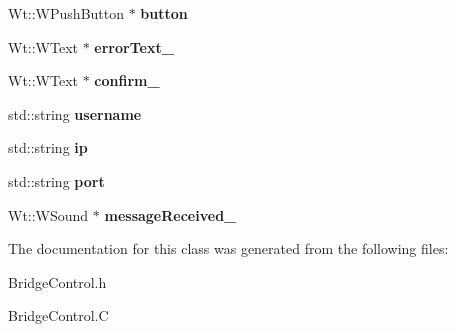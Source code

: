 \begin{DoxyCompactItemize}
\item 
Wt\+::\+W\+Push\+Button $\ast$ {\bfseries button}\hypertarget{classBridgeControlWidget_ae44e24e9f180d7d8727a5989467a627e}{}\label{classBridgeControlWidget_ae44e24e9f180d7d8727a5989467a627e}

\item 
Wt\+::\+W\+Text $\ast$ {\bfseries error\+Text\+\_\+}\hypertarget{classBridgeControlWidget_a3a1af1bc24a550a4bff633f62cb54b00}{}\label{classBridgeControlWidget_a3a1af1bc24a550a4bff633f62cb54b00}

\item 
Wt\+::\+W\+Text $\ast$ {\bfseries confirm\+\_\+}\hypertarget{classBridgeControlWidget_a8fc1ea20843b3715ddbf72ef4aa84c6c}{}\label{classBridgeControlWidget_a8fc1ea20843b3715ddbf72ef4aa84c6c}

\item 
std\+::string {\bfseries username}\hypertarget{classBridgeControlWidget_ac195eb9bda89539ad76dcb68c183d7d3}{}\label{classBridgeControlWidget_ac195eb9bda89539ad76dcb68c183d7d3}

\item 
std\+::string {\bfseries ip}\hypertarget{classBridgeControlWidget_a0d2312d2fd67c2ed6a285d6c2e336d29}{}\label{classBridgeControlWidget_a0d2312d2fd67c2ed6a285d6c2e336d29}

\item 
std\+::string {\bfseries port}\hypertarget{classBridgeControlWidget_a1c8a761d43d554385f1d5416c611665c}{}\label{classBridgeControlWidget_a1c8a761d43d554385f1d5416c611665c}

\item 
Wt\+::\+W\+Sound $\ast$ {\bfseries message\+Received\+\_\+}\hypertarget{classBridgeControlWidget_a95671fff1cc255ba4d5eaaab4c1a8277}{}\label{classBridgeControlWidget_a95671fff1cc255ba4d5eaaab4c1a8277}

\end{DoxyCompactItemize}


The documentation for this class was generated from the following files\+:\begin{DoxyCompactItemize}
\item 
Bridge\+Control.\+h\item 
Bridge\+Control.\+C\end{DoxyCompactItemize}
